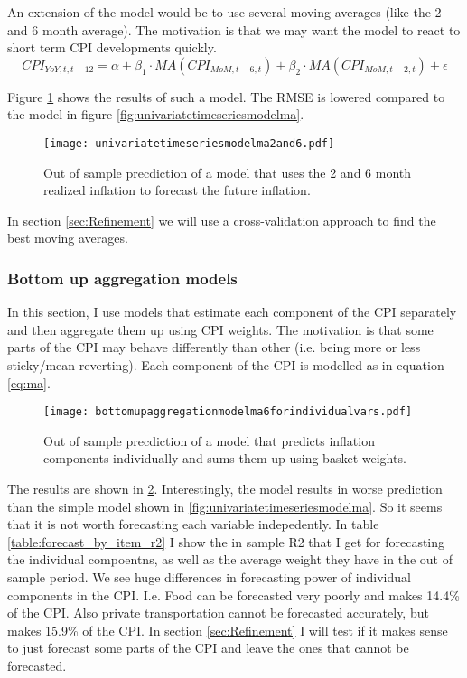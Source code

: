 \documentclass[12pt]{article}
\begin{document}
An extension of the model would be to use several moving averages (like the 2 and 6 month average). The motivation is that we may want the model to react to short term CPI developments quickly. 
\begin{equation}
CPI_{YoY, t, t+12} = \alpha + \beta_1 \cdot MA(CPI_{MoM,t-6,t})+ \beta_2 \cdot MA(CPI_{MoM,t-2,t})+\epsilon
\end{equation}

Figure \ref{fig:univariatetimeseriesmodelma2and6} shows the results of such a model. The RMSE is lowered compared to the model in figure \ref{fig:univariatetimeseriesmodelma}. 

\begin{figure}[h]
    \centering
    \texttt{[image: univariatetimeseriesmodelma2and6.pdf]}
    \caption{Out of sample precdiction of a model that uses the 2 and 6 month realized inflation to forecast the future inflation.}
    \label{fig:univariatetimeseriesmodelma2and6}
\end{figure}
In section \ref{sec:Refinement} we will use a cross-validation approach to find the best moving averages.

\subsubsection{Bottom up aggregation models}
\label{sec:agg}
In this section, I use models that estimate each component of the CPI separately and then aggregate them up using CPI weights. The motivation is that some parts of the CPI may behave differently than other (i.e. being more or less sticky/mean reverting). 
Each component of the CPI is modelled as in equation \ref{eq:ma}. 
\begin{figure}[h]
    \centering
    \texttt{[image: bottomupaggregationmodelma6forindividualvars.pdf]}
    \caption{Out of sample precdiction of a model that predicts inflation components individually and sums them up using basket weights.}
    \label{fig:bottomupaggregationmodelma6forindividualvars}
\end{figure}

The results are shown in \ref{fig:bottomupaggregationmodelma6forindividualvars}. Interestingly, the model results in worse prediction than the simple model shown in \ref{fig:univariatetimeseriesmodelma}. So it seems that it is not worth forecasting each variable indepedently.  In table \ref{table:forecast_by_item_r2} I show the in sample R2 that I get for forecasting the individual compoentns, as well as the average weight they have in the out of sample period.
We see huge differences in forecasting power of individual components in the CPI. I.e. Food can be forecasted very poorly and makes 14.4\% of the CPI. Also private transportation cannot be forecasted accurately, but makes 15.9\% of the CPI. 
In section  \ref{sec:Refinement} I will test if it makes sense to just forecast some parts of the CPI and leave the ones that cannot be forecasted. 
\end{document}
